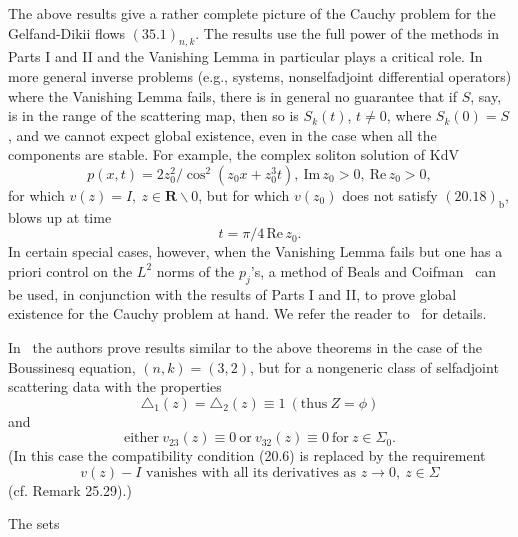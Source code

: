 \documentclass{surv-l}
\theoremstyle{plain}
\theoremstyle{definition}
\numberwithin{equation}{chapter}
\begin{document}
The above results give a rather complete picture of the Cauchy problem for the Gelfand-Dikii flows $(35.1)_{n,k}$. The results use the full power of the methods in Parts I and II and the Vanishing Lemma in particular plays a critical role. In more general inverse problems (e.g., systems, nonselfadjoint differential operators) where the Vanishing Lemma fails, there is in general no guarantee that if $S$, say, is in the range of the scattering map, then so is $S_{k}(t)$, $t\neq 0$, where $S_{k}(0)=S$, and we cannot expect global existence, even in the case when all the components are stable. For example, the complex soliton solution of KdV
\begin{equation*}
p(x, t)=2z_{0}^{2}/\cos^{2}(z_{0}x+z_{0}^{3}t),\ \mathrm{Im}\,z_{0}>0,\ \mathrm{Re}\, z_{0}>0,
\end{equation*}
for which $v(z)=I,\ z\in \mathbf{R}\backslash 0$, but for which $v(z_{0})$ does not satisfy $(20.18)_{\mathrm{b}}$, blows up at time
\begin{equation*}
t=\pi/4\,\mathrm{Re}\, z_{0}.
\end{equation*}
In certain special cases, however, when the Vanishing Lemma fails but one has a priori control on the $L^{2}$ norms of the $p_{j}$'s, a method of Beals and Coifman~\cite{BC2} can be used, in conjunction with the results of Parts I and II, to prove global existence for the Cauchy problem at hand. We refer the reader to~\cite{BC2} for details.

In~\cite{DTT} the authors prove results similar to the above theorems in the case of the Boussinesq equation, $(n, k)=(3, 2)$, but for a nongeneric class of selfadjoint scattering data with the properties
\setcounter{equation}{39}
\begin{equation}\label{eq35.40}
\triangle_{1}(z)=\triangle_{2}(z)\equiv 1\ (\mathrm{thus}\  Z=\phi)
\end{equation}
and
\begin{equation}\label{eq35.41}
\mathrm{either}\ v_{23}(z)\equiv 0\ \mathrm{or}\ v_{32}(z)\equiv 0\ \mathrm{for}\ z\in\Sigma_{0}.
\end{equation}
(In this case the compatibility condition (20.6) is replaced by the requirement
\begin{equation}\label{eq35.42}
v(z)-I \text{ vanishes with all its derivatives as } z\rightarrow 0,\  z\in\Sigma
\end{equation}
(cf. Remark 25.29).)

The sets
\end{document}
